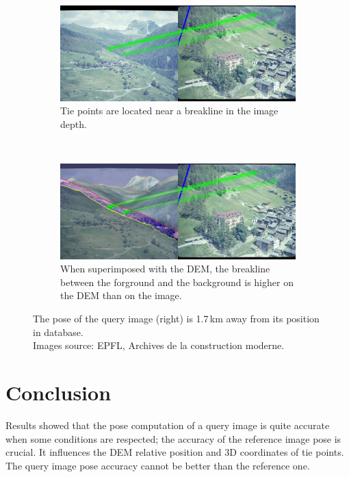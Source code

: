 \documentclass[fleqn,10pt]{wlpeerj} %
\begin{document}
\begin{figure}[H]
\centering
\begin{subfigure}{0.48\linewidth}
    \includegraphics[width=1\linewidth]{ex2.jpg}
    \caption{Tie points are located near a breakline in the image depth.}
    \label{ex2:1}
\end{subfigure}
~
\begin{subfigure}{0.48\linewidth}
    \includegraphics[width=1\linewidth]{ex2_mnt.jpg}
    \caption{When superimposed with the DEM, the breakline between the forground 
    and the background is higher on the DEM than on the image.}
    \label{ex2:2}
\end{subfigure}
\caption[]{The pose of the query image (right) is 1.7\,km away from its position in database.\\
Images source: EPFL, Archives de la construction moderne.}
\label{ex2}
\end{figure}










\section*{Conclusion}
Results showed that the pose computation of a query image is quite accurate
when some conditions are respected;  the accuracy of the reference image
pose is crucial. It influences the DEM relative position and 3D coordinates of
tie points. The query image pose accuracy cannot be better than the reference one.
\end{document}
